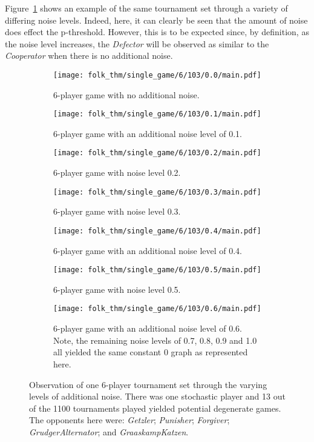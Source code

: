 Figure~\ref{fig:single_set_vary_noise} shows an example of the same tournament set through a variety of
differing noise levels. Indeed, here, it can clearly be seen that the amount of
noise does effect the p-threshold. However, this is to be expected since, by
definition, as the noise level increases, the \textit{Defector} will be observed
as similar to the \textit{Cooperator} when there is no additional noise.

\begin{figure}
    \begin{subfigure}{0.3\textwidth}
        \centering
        \texttt{[image: folk\_thm/single\_game/6/103/0.0/main.pdf]}
        \caption{6-player game with no additional noise.}
    \end{subfigure}
    \begin{subfigure}{0.3\textwidth}
        \centering
        \texttt{[image: folk\_thm/single\_game/6/103/0.1/main.pdf]}
        \caption{6-player game with an additional noise level of 0.1.}
    \end{subfigure}
    \begin{subfigure}{0.3\textwidth}
        \centering
        \texttt{[image: folk\_thm/single\_game/6/103/0.2/main.pdf]}
        \caption{6-player game with noise level 0.2.}
    \end{subfigure}

    \begin{subfigure}{0.2\textwidth}
        \centering
        \texttt{[image: folk\_thm/single\_game/6/103/0.3/main.pdf]}
        \caption{6-player game with noise level 0.3.}
    \end{subfigure}
    \begin{subfigure}{0.2\textwidth}
        \centering
        \texttt{[image: folk\_thm/single\_game/6/103/0.4/main.pdf]}
        \caption{6-player game with an additional noise level of 0.4.}
    \end{subfigure}
    \begin{subfigure}{0.2\textwidth}
        \centering
        \texttt{[image: folk\_thm/single\_game/6/103/0.5/main.pdf]}
        \caption{6-player game with noise level 0.5.}
    \end{subfigure}
    \begin{subfigure}{0.2\textwidth}
        \centering
        \texttt{[image: folk\_thm/single\_game/6/103/0.6/main.pdf]}
        \caption{6-player game with an additional noise level of 0.6. Note, the remaining noise levels of 0.7, 0.8, 0.9 and 1.0 all yielded the same constant 0 graph as represented here.}
    \end{subfigure}
    \caption{Observation of one 6-player tournament set through the varying
    levels of additional noise. There was one stochastic player and 13 out of
    the 1100 tournaments played yielded potential degenerate games. The opponents here were: \textit{Getzler};
    \textit{Punisher}; \textit{Forgiver}; \textit{GrudgerAlternator}; and \textit{GraaskampKatzen}.}\label{fig:single_set_vary_noise}
\end{figure}


